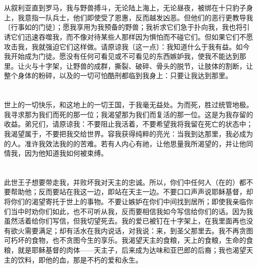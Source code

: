
\section{}

从叙利亚直到罗马，我与野兽搏斗，无论陆上海上，无论昼夜，被绑在十只豹子身上，我意指一队兵士，他们即使受了恩惠，反而越发凶恶。但他们的恶行更教导我〔行事如的门徒〕；愿我享用为我预备的野兽；我祈求它们急于扑向我，我也将引诱它们迅速吞噬我，而不像对待某些人那样因为惧怕而不碰它们。但如果它们不愿攻击我，我就强迫它们这样做。请原谅我〔这一点〕：我知道什么于我有益。如今我开始成为门徒。愿没有任何可看见或不可看见的东西嫉妒我，使我不能达到那里。让火与十字架，让野兽的成群，撕裂、破碎、骨头的脱节，让肢体的割断，让整个身体的粉碎，以及的一切可怕酷刑都临到我身上：只要让我达到那里。\par


\section{}

世上的一切快乐，和这地上的一切王国，于我毫无益处。为而死，胜过统管地极。我寻求那为我们而死的那一位；我渴望那为我们而复活的那一位。这是为我存留的收益。弟兄们，请原谅我：不要阻止我活着，不要希望我将我留在死亡的状态中；我渴望属于，不要把我交给世界。容我获得纯粹的亮光：当我到达那里，我必成为的人。准许我效法我的的苦难。若有人内心有祂，让他思量我所渴望的，并让他同情我，因为他知道我如何被束缚。\par


\section{}

此世王子想要带走我，并败坏我对天主的忠诚。所以，你们中任何人（在的）都不要帮助他；反而要站在我这一边，即站在天主一边。不要口口声声说耶稣基督，却将你们的渴望寄托于世上的事物。不要让嫉妒在你们中间找到居所；即使我亲临你们当中时劝你们如此，也不可听从我，反而要相信我如今写信给你们的话。因为我虽然活着给你们写信，但我切望死去。我的爱已被钉在十字架上，在我里面再也没有欲火需要满足；却有活水在我内说话，对我说：来，到圣父那里去。我不再贪图可朽坏的食物，也不贪图今生的享乐。我渴望天主的食粮，天上的食粮，生命的食粮，就是耶稣基督的肉体——天主子，后来成为达味和亚巴郎的后裔；我也渴望天主的饮料，即他的血，那是不朽的爱和永生。\newline{}\par

